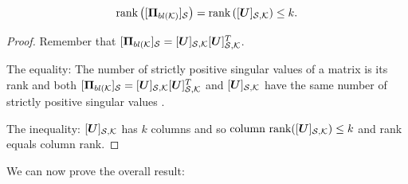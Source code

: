 \begin{lemma}
\label{lemma:square_to_rect_rank}
\begin{equation}
\rank{\projbl[S]} =  \rank{\matrsubU{S}} \leq k. 
\end{equation}
\end{lemma}
\begin{proof}
Remember that $[\bm{\Pi}_{bl(\mathcal{K}}]_{\mathcal{S}}= [\bm{U}]_{\mathcal{S},\mathcal{K}}[\bm{U}]_{\mathcal{S},\mathcal{K}}^T$.

The equality: The number of strictly positive singular values of a matrix is its rank \cite[Corollary 2.4.6]{golub13} and both $[\bm{\Pi}_{bl(\mathcal{K}}]_{\mathcal{S}}= [\bm{U}]_{\mathcal{S},\mathcal{K}}[\bm{U}]_{\mathcal{S},\mathcal{K}}^T$ and $[\bm{U}]_{\mathcal{S},\mathcal{K}}$ have the same number of strictly positive singular values \cite[Eq. (8.6.2)]{golub13}. 

The inequality: $[\bm{U}]_{\mathcal{S},\mathcal{K}}$ has $k$ columns and so $\textrm{column rank}([\bm{U}]_{\mathcal{S},\mathcal{K}})\leq k$ and rank equals column rank.
\end{proof}

We can now prove the overall result:

\iffalse
\begin{proof}
    By %
    Lemma \ref{lemma:LS_xi_1_is_rank} and Lemma \ref{lemma:LS_delta_1_is_0_improves_stability}.
\end{proof}
\begin{lemma}
\label{lemma:LS_delta_1_is_0_improves_stability}
    For LS, $\Delta_{1} = 0 \iff \Delta_{2} \leq 0$.
\end{lemma}
\fi

